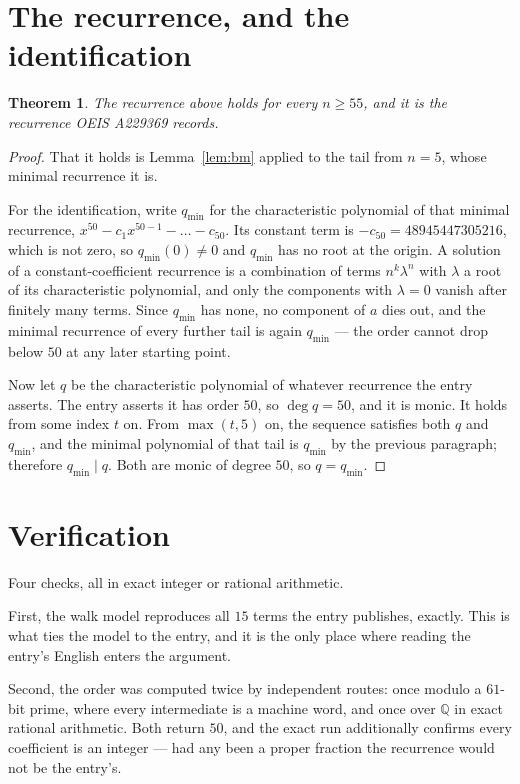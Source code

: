 \documentclass[11pt,a4paper]{article}
\theoremstyle{plain}
\newtheorem{theorem}{Theorem}
\theoremstyle{definition}
\begin{document}
\section{The recurrence, and the identification}

\begin{theorem}
The recurrence above holds for every $n\ge55$, and it is the recurrence OEIS A229369 records.
\end{theorem}

\begin{proof}
That it holds is Lemma~\ref{lem:bm} applied to the tail from $n=5$, whose minimal
recurrence it is.

For the identification, write $q_{\min}$ for the characteristic polynomial of that minimal
recurrence, $x^{50}-c_1x^{50-1}-\dots-c_{50}$. Its constant term is
$-c_{50}=48945447305216$, which is not zero, so $q_{\min}(0)\neq0$ and $q_{\min}$ has no
root at the origin. A solution of a constant-coefficient recurrence is a combination of terms
$n^{k}\lambda^{n}$ with $\lambda$ a root of its characteristic polynomial, and only the
components with $\lambda=0$ vanish after finitely many terms. Since $q_{\min}$ has none, no
component of $a$ dies out, and the minimal recurrence of every further tail is again
$q_{\min}$ --- the order cannot drop below $50$ at any later starting point.

Now let $q$ be the characteristic polynomial of whatever recurrence the entry asserts. The
entry asserts it has order $50$, so $\deg q=50$, and it is monic. It holds from some
index $t$ on. From $\max(t,5)$ on, the sequence satisfies both $q$ and $q_{\min}$, and
the minimal polynomial of that tail is $q_{\min}$ by the previous paragraph; therefore
$q_{\min}\mid q$. Both are monic of degree $50$, so $q=q_{\min}$.
\end{proof}

\section{Verification}

Four checks, all in exact integer or rational arithmetic.

First, the walk model reproduces all $15$ terms the entry publishes, exactly. This is
what ties the model to the entry, and it is the only place where reading the entry's English
enters the argument.

Second, the order was computed twice by independent routes: once modulo a $61$-bit prime, where
every intermediate is a machine word, and once over $\mathbb{Q}$ in exact rational arithmetic.
Both return $50$, and the exact run additionally confirms every coefficient is an integer
--- had any been a proper fraction the recurrence would not be the entry's.
\end{document}
